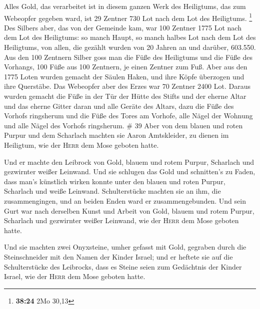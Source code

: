 Alles Gold, das verarbeitet ist in diesem ganzen Werk
des Heiligtums, das zum Webeopfer gegeben ward, ist 29 Zentner 730 Lot
nach dem Lot des Heiligtums. \footnote{\textbf{38:24} 2Mo 30,13}
 Des Silbers aber, das von der Gemeinde kam, war 100
Zentner 1775 Lot nach dem Lot des Heiligtums:  so manch
Haupt, so manch halbes Lot nach dem Lot des Heiligtums, von allen, die
gezählt wurden von 20 Jahren an und darüber, 603.550. 
Aus den 100 Zentnern Silber goss man die Füße des Heiligtums und die
Füße des Vorhangs, 100 Füße aus 100 Zentnern, je einen Zentner zum Fuß.
 Aber aus den 1775 Loten wurden gemacht der Säulen Haken,
und ihre Köpfe überzogen und ihre Querstäbe.  Das
Webeopfer aber des Erzes war 70 Zentner 2400 Lot.  Daraus
wurden gemacht die Füße in der Tür der Hütte des Stifts und der eherne
Altar und das eherne Gitter daran und alle Geräte des Altars,
 dazu die Füße des Vorhofs ringsherum und die Füße des
Tores am Vorhofe, alle Nägel der Wohnung und alle Nägel des Vorhofs
ringsherum. \# 39  Aber von dem blauen und roten Purpur
und dem Scharlach machten sie Aaron Amtskleider, zu dienen im Heiligtum,
wie der \textsc{Herr} dem Mose geboten hatte.

 Und er machte den Leibrock von Gold, blauem und rotem
Purpur, Scharlach und gezwirnter weißer Leinwand.  Und sie
schlugen das Gold und schnitten's zu Faden, dass man's künstlich wirken
konnte unter den blauen und roten Purpur, Scharlach und weiße Leinwand.
 Schulterstücke machten sie an ihm, die zusammengingen,
und an beiden Enden ward er zusammengebunden.  Und sein
Gurt war nach derselben Kunst und Arbeit von Gold, blauem und rotem
Purpur, Scharlach und gezwirnter weißer Leinwand, wie der \textsc{Herr}
dem Mose geboten hatte.

 Und sie machten zwei Onyxsteine, umher gefasst mit Gold,
gegraben durch die Steinschneider mit den Namen der Kinder Israel;
 und er heftete sie auf die Schulterstücke des Leibrocks,
dass es Steine seien zum Gedächtnis der Kinder Israel, wie der
\textsc{Herr} dem Mose geboten hatte.


